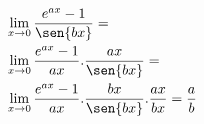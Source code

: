 \begin{ex}
\begin{align}
&\lim_{x\rightarrow 0} \frac{e^{ax}-1}{\sen{bx}}=\nonumber\\
&\lim_{x\rightarrow 0}\frac{e^{ax}-1}{ax}.\frac{ax}{\sen{bx}}=\nonumber\\
&\lim_{x\rightarrow 0} \frac{e^{ax}-1}{ax}.\frac{bx}{\sen{bx}}.\frac{ax}{bx}=\frac{a}{b}\nonumber
\end{align}
\end{ex}
